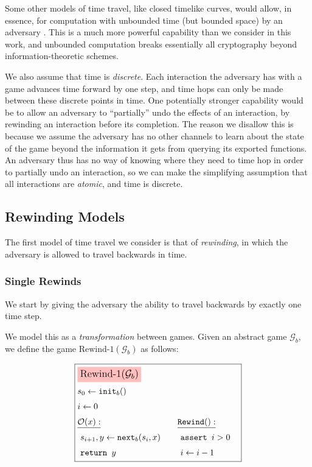 Some other models of time travel, like closed timelike curves, would allow,
in essence, for computation with unbounded time (but bounded space) by an adversary \cite{Brun03}.
This is a much more powerful capability than we consider in this work,
and unbounded computation breaks essentially all cryptography beyond
information-theoretic schemes.

We also assume that time is \emph{discrete}.
Each interaction the adversary has with a game advances time forward
by one step, and time hops can only be made between these discrete points
in time.
One potentially stronger capability would be to allow an adversary
to ``partially'' undo the effects of an interaction, by rewinding
an interaction before its completion.
The reason we disallow this is because we assume the adversary has
no other channels to learn about the state of the game beyond the
information it gets from querying its exported functions.
An adversary thus has no way of knowing where they need to time hop
in order to partially undo an interaction, so we can make the simplifying
assumption that all interactions are \emph{atomic}, and time is discrete.

\subsection{Rewinding Models}

The first model of time travel we consider is that of \emph{rewinding},
in which the adversary is allowed to travel backwards in time.

\subsubsection{Single Rewinds}

We start by giving the adversary the ability to travel backwards
by exactly one time step.

We model this as a \emph{transformation} between games.
Given an abstract game $\mathcal{G}_b$, we define the game
$\text{Rewind-1}(\mathcal{G}_b)$ as follows:

\begin{game}
\captionsetup{justification=centering}
$$
\boxed{
\begin{aligned}
&\colorbox{pink}{\large $\text{Rewind-1}(\mathcal{G}_b)$}\cr
&s_0 \gets \texttt{init}_b()\cr
&i \gets 0\cr
&\begin{aligned}
    &\underline{\mathcal{O}(x):}\cr
    &\ s_{i + 1}, y \gets \texttt{next}_b(s_i, x)\cr
    &\ \texttt{return } y\cr
\end{aligned}
&\begin{aligned}
    &\underline{\texttt{Rewind}():}\cr
    &\ \texttt{assert } i > 0\cr
    &\ i \gets i - 1\cr
\end{aligned}\cr
\end{aligned}
}
$$
\caption{$\text{Rewind-1}(\mathcal{G}_b)$}
\end{game}

